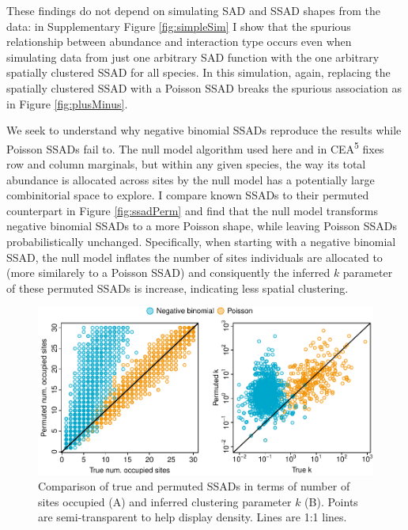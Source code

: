 \documentclass[]{article}
\begin{document}
These findings do not depend on simulating SAD and SSAD shapes from the
data: in Supplementary Figure \ref{fig:simpleSim} I show that the
spurious relationship between abundance and interaction type occurs even
when simulating data from just one arbitrary SAD function with the one
arbitrary spatially clustered SSAD for all species. In this simulation,
again, replacing the spatially clustered SSAD with a Poisson SSAD breaks
the spurious association as in Figure \ref{fig:plusMinus}.

We seek to understand why negative binomial SSADs reproduce the results
while Poisson SSADs fail to. The null model algorithm used here and in
CEA\textsuperscript{5} fixes row and column marginals, but within any
given species, the way its total abundance is allocated across sites by
the null model has a potentially large combinitorial space to explore. I
compare known SSADs to their permuted counterpart in Figure
\ref{fig:ssadPerm} and find that the null model transforms negative
binomial SSADs to a more Poisson shape, while leaving Poisson SSADs
probabilistically unchanged. Specifically, when starting with a negative
binomial SSAD, the null model inflates the number of sites individuals
are allocated to (more similarely to a Poisson SSAD) and consiquently
the inferred \(k\) parameter of these permuted SSADs is increase,
indicating less spatial clustering.

\begin{figure}

{\centering \includegraphics{RarePlusComMinus_files/figure-latex/ssadPerm_plot-1} 

}

\caption{Comparison of true and permuted SSADs in terms of number of sites occupied (A) and inferred clustering parameter $k$ (B). Points are semi-transparent to help display density. Lines are 1:1 lines. \label{fig:ssadPerm}}\label{fig:ssadPerm_plot}
\end{figure}
\end{document}
